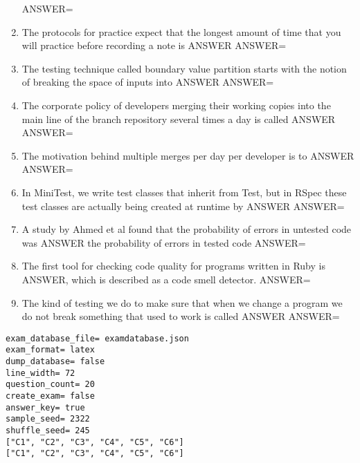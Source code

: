 \documentclass{exam}
\begin{document}
\begin{enumerate}
ANSWER=
\item The protocols for practice expect that the longest amount of time that you will practice before recording a note is ANSWER\newline
ANSWER=
\item The testing technique called boundary value partition starts with the notion of breaking the space of inputs into ANSWER\newline
ANSWER=
\item The corporate policy of developers merging their working copies into the main line of the branch repository several times a day is called ANSWER\newline
ANSWER=
\item The motivation behind multiple merges per day per developer is to ANSWER\newline
ANSWER=
\item In MiniTest, we write test classes that inherit from Test, but in RSpec these test classes are actually being created at runtime by ANSWER\newline
ANSWER=
\item A study by Ahmed et al found that the probability of errors in untested code was ANSWER the probability of errors in tested code\newline
ANSWER=
\item The first tool for checking code quality for programs written in Ruby is ANSWER, which is described as a code smell detector.\newline
ANSWER=
\item The kind of testing we do to make sure that when we change a program we do not break something that used to work is called ANSWER\newline
ANSWER=
\end{enumerate}
\newpage
\begin{verbatim}
exam_database_file= examdatabase.json
exam_format= latex
dump_database= false
line_width= 72
question_count= 20
create_exam= false
answer_key= true
sample_seed= 2322
shuffle_seed= 245
["C1", "C2", "C3", "C4", "C5", "C6"]
["C1", "C2", "C3", "C4", "C5", "C6"]
\end{verbatim}
\end{document}
